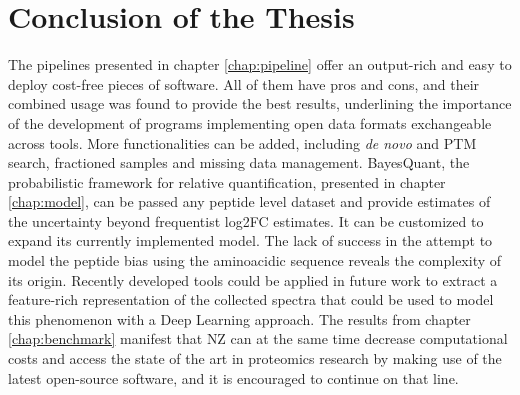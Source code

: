 \chapter{Conclusion of the Thesis}
\label{chap:conclusion}

The pipelines presented in chapter \ref{chap:pipeline} offer an output-rich and easy to deploy cost-free pieces of software. All of them have pros and cons, and their combined usage was found to provide the best results, underlining the importance of the development of programs implementing open data formats exchangeable across tools. More functionalities can be added, including \textit{de novo} and \ac{PTM} search, fractioned samples and missing data management. BayesQuant, the probabilistic framework for relative quantification, presented in chapter \ref{chap:model}, can be passed any peptide level dataset and provide estimates of the uncertainty beyond frequentist \ac{log2FC} estimates. It can be customized to expand its currently implemented model. The lack of success in the attempt to model the peptide bias using the aminoacidic sequence reveals the complexity of its origin. Recently developed tools  could be applied in future work to extract a feature-rich representation of the collected spectra that could be used to model this phenomenon with a Deep Learning approach. The results from chapter \ref{chap:benchmark} manifest that \ac{NZ} can at the same time decrease computational costs and access the state of the art in proteomics research by making use of the latest open-source software, and it is encouraged to continue on that line.